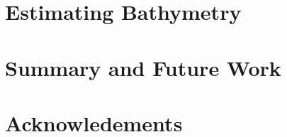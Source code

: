 \documentclass[12pt]{article}
\begin{document}
\section{Estimating Bathymetry}




%

\section{Summary and Future Work}


\section{Acknowledements}


%


\end{document}
